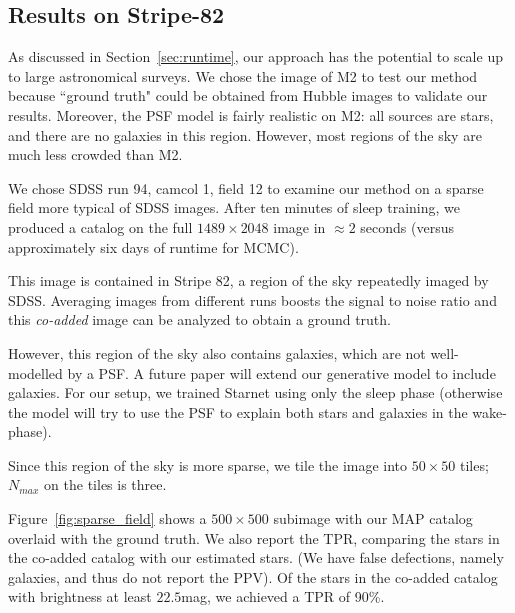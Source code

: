 \subsection{Results on Stripe-82}
As discussed in Section~\ref{sec:runtime}, our approach has the potential 
to scale up to large astronomical surveys. We chose the image of M2 to test our method because ``ground truth" could be obtained from Hubble images to validate our results. Moreover, 
the PSF model is fairly realistic on M2: all sources are 
stars, and there are no galaxies in this region. 
However, most regions of the sky are much less 
crowded than M2.


We chose SDSS run 94, camcol 1, field  12 to examine our method on a sparse field more typical of SDSS 
images. After ten minutes of sleep training, we produced a catalog on the full $1489\times 2048$ image in $\approx2$ seconds (versus approximately six days of runtime for MCMC). 

This image is contained in Stripe 82, a region of the sky repeatedly imaged by SDSS. Averaging images from different runs boosts the signal to noise ratio and this {\itshape co-added} image can be analyzed to obtain a ground truth. 

However, this region of the sky also contains galaxies, which are 
not well-modelled by a PSF. A future paper will extend our generative model to include galaxies. For our setup, we trained Starnet using only the sleep phase (otherwise the model will try to use the PSF to explain both stars and galaxies in the wake-phase). 

Since this region of the sky is more sparse, we tile the image into $50\times 50$ tiles; $N_{max}$ on the tiles is three. 

Figure~\ref{fig:sparse_field} shows a $500\times 500$ subimage with 
our MAP catalog overlaid with the ground truth. We also report the 
TPR, comparing the stars in the co-added catalog with our estimated stars. (We have false defections, namely galaxies, and thus 
do not report the PPV). Of the stars in the co-added catalog with brightness at least $22.5$mag, we achieved a TPR of 90\%. 



